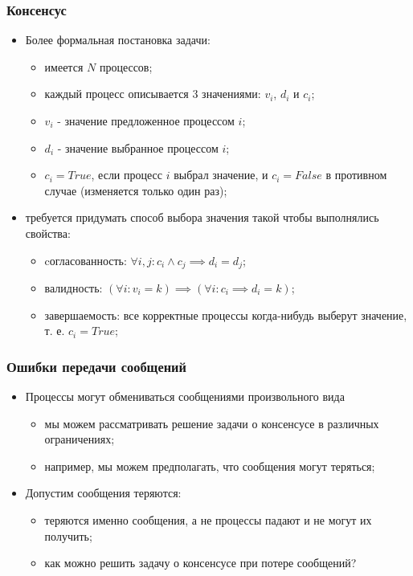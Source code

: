\begin{frame}
\frametitle{Консенсус}
\begin{itemize}
  \item<1-> Более формальная постановка задачи:
    \begin{itemize}
      \item имеется $N$ процессов;
      \item каждый процесс описывается 3 значениями: $v_i$, $d_i$ и $c_i$;
      \item $v_i$ - значение предложенное процессом $i$;
      \item $d_i$ - значение выбранное процессом $i$;
      \item $c_i = True$, если процесс $i$ выбрал значение, и $c_i = False$ в противном случае (изменяется только один раз);
    \end{itemize}
  \item<2-> требуется придумать способ выбора значения такой чтобы выполнялись свойства:
    \begin{itemize}
      \item cогласованность: $\forall i,j : c_i \land c_j \implies d_i = d_j$;
      \item валидность: $\left(\forall i : v_i = k\right) \implies \left(\forall i : c_i \implies d_i = k\right)$;
      \item завершаемость: все корректные процессы когда-нибудь выберут значение, т. е. $c_i = True$;
    \end{itemize}
\end{itemize}
\end{frame}

\begin{frame}
\frametitle{Ошибки передачи сообщений}
\begin{itemize}
  \item<1-> Процессы могут обмениваться сообщениями произвольного вида
    \begin{itemize}
      \item мы можем рассматривать решение задачи о консенсусе в различных ограничениях;
      \item например, мы можем предполагать, что сообщения могут теряться;
    \end{itemize}
  \item<2-> Допустим сообщения теряются:
    \begin{itemize}
      \item теряются именно сообщения, а не процессы падают и не могут их получить;
      \item как можно решить задачу о консенсусе при потере сообщений?
    \end{itemize}
\end{itemize}
\end{frame}

